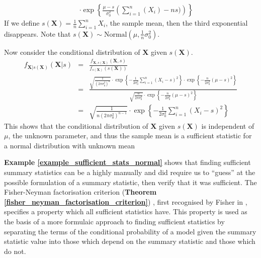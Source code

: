 \documentclass[11pt,a4paper]{article}
\theoremstyle{break}
\begin{document}
\begin{box_example}
\[\begin{array}{rcl}
      &&\cdot\exp\left\{\frac{\mu-s}{\sigma_0^2}\left(\sum_{i=1}^n(X_i)-ns)\right)\right\}
    \end{array}\]
    If we define $s(\mathbf{X})=\frac1n\sum_{i=1}^nX_i$, the sample mean, then the third exponential disappears. Note that $s(\mathbf{X})\sim\text{Normal}\left(\mu,\frac1n\sigma_0^2\right)$.
    \par Now consider the conditional distribution of $\mathbf{X}$ given $s(\mathbf{X})$.
    \[\begin{array}{rcl}
      f_{\mathbf{X}|s(\mathbf{X})}(\mathbf{X}|s)&=&\frac{f_{\mathbf{X},s(\mathbf{X})}(\mathbf{X},s)}{f_{s(\mathbf{X})}(s(\mathbf{X}))}\\
      &=&\frac{\sqrt{\frac1{\left(2\pi\sigma_0^2\right)^n}}\cdot\exp\left\{-\frac1{2\sigma_0^2}\sum_{i=1}^n(X_i-s)^2\right\}\cdot\exp\left\{-\frac{n}{2\sigma_0^2}(\mu-s)^2\right\}}{\sqrt{\frac{n}{2\pi\sigma_0^2}}\cdot\exp\left\{-\frac{n}{2\sigma_0^2}(\mu-s)^2\right\}}\\
      &=&\sqrt{\frac{1}{n(2\pi\sigma_0^2)^{n-1}}}\cdot\exp\left\{-\frac1{2\sigma_0^2}\sum_{i=1}^n(X_i-s)^2\right\}
    \end{array}\]
    This shows that the conditional distribution of $\mathbf{X}$ given $s(\mathbf{X})$ is independent of $\mu$, the unknown parameter, and thus the sample mean is a sufficient statistic for a normal distribution with unknown mean
  \end{box_example}

  \par \textbf{Example \ref{example_sufficient_stats_normal}} shows that finding sufficient summary statistics can be a highly manually and did require us to ``guess'' at the possible formulation of a summary statistic, then verify that it was sufficient. The Fisher-Neyman factorisation criterion (\textbf{Theorem \ref{fisher_neyman_factorisation_criterion}}) \cite[]{fnf_fisher_part,fnf_neyman_part}, first recognised by Fisher in \cite[]{fnf_fisher_part}, specifies a property which all sufficient statistics have. This property is used as the basis of a more formulaic approach to finding sufficient statistics by separating the terms of the conditional probability of a model given the summary statistic value into those which depend on the summary statistic and those which do not.
\end{document}

